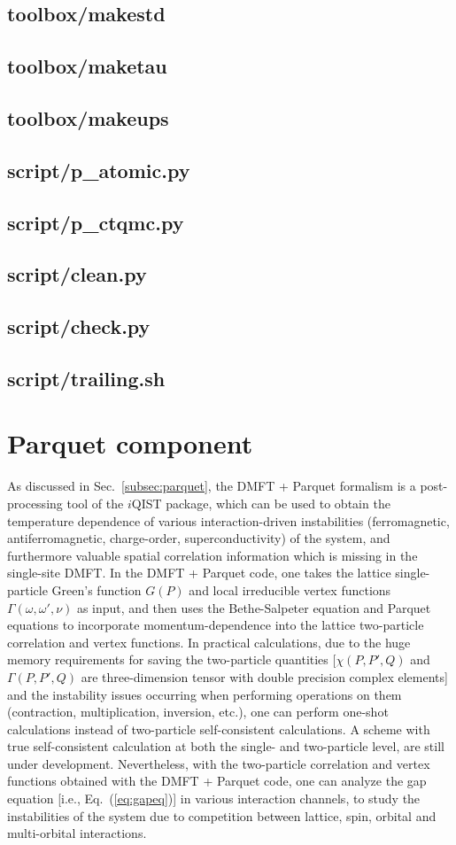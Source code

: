 \subsection{toolbox/makestd}
\subsection{toolbox/maketau}
\subsection{toolbox/makeups}
\subsection{script/p\_atomic.py}
\subsection{script/p\_ctqmc.py}
\subsection{script/clean.py}
\subsection{script/check.py}
\subsection{script/trailing.sh}
\section{Parquet component}
As discussed in Sec.~\ref{subsec:parquet}, the DMFT + Parquet formalism is a post-processing tool of the $i$QIST package, which can be used to obtain the temperature dependence of various interaction-driven instabilities (ferromagnetic, antiferromagnetic, charge-order, superconductivity) of the system, and furthermore valuable spatial correlation information which is missing in the single-site DMFT. In the DMFT + Parquet code, one takes the lattice single-particle Green's function $G(P)$ and local irreducible vertex functions $\Gamma(\omega,\omega',\nu)$ as input, and then uses the Bethe-Salpeter equation and Parquet equations to incorporate momentum-dependence into the lattice two-particle correlation and vertex functions. In practical calculations, due to the huge memory requirements for saving the two-particle quantities [$\chi(P,P',Q)$ and $\Gamma(P,P',Q)$ are three-dimension tensor with double precision complex elements] and the instability issues occurring when performing operations on them (contraction, multiplication, inversion, etc.), one can perform one-shot calculations instead of two-particle self-consistent calculations. A scheme with true self-consistent calculation at both the single- and two-particle level, are still under development. Nevertheless, with the two-particle correlation and vertex functions obtained with the DMFT + Parquet code, one can  analyze the gap equation [i.e., Eq.~(\ref{eq:gapeq})] in various interaction channels, to study the instabilities of the system due to competition between lattice, spin, orbital and multi-orbital interactions.
